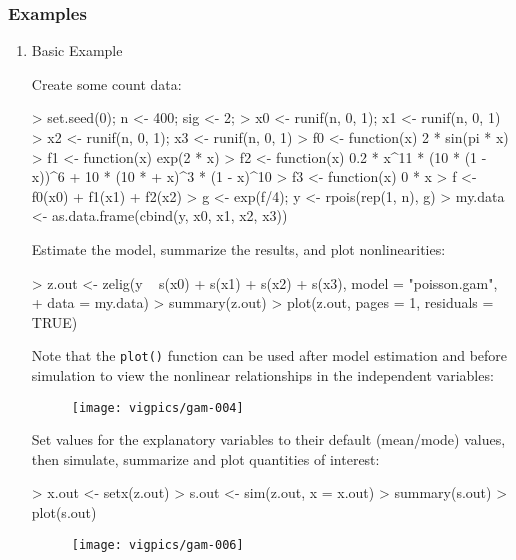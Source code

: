 \subsubsection{Examples}
\begin{enumerate}
\item Basic Example

Create some count data:

\begin{Schunk}
\begin{Sinput}
> set.seed(0);  n <- 400; sig <- 2; 
> x0 <- runif(n, 0, 1);  x1 <- runif(n, 0, 1)
> x2 <- runif(n, 0, 1);  x3 <- runif(n, 0, 1)
> f0 <- function(x) 2 * sin(pi * x)
> f1 <- function(x) exp(2 * x)
> f2 <- function(x) 0.2 * x^11 * (10 * (1 - x))^6 + 10 * (10 * 
+     x)^3 * (1 - x)^10
> f3 <- function(x) 0 * x
> f <- f0(x0) + f1(x1) + f2(x2)
> g <- exp(f/4);  y <- rpois(rep(1, n), g)
> my.data <- as.data.frame(cbind(y, x0, x1, x2, x3))
\end{Sinput}
\end{Schunk}

Estimate the model, summarize the results, and plot nonlinearities:

\begin{Schunk}
\begin{Sinput}
> z.out <- zelig(y ~ s(x0) + s(x1) + s(x2) + s(x3), model = "poisson.gam", 
+     data = my.data)
> summary(z.out)
> plot(z.out, pages = 1, residuals = TRUE)
\end{Sinput}
\end{Schunk}
Note that the {\tt plot()} function can be used after model estimation and before simulation to view the nonlinear relationships in the independent variables: 

\begin{figure}[here]
\centering
\texttt{[image: vigpics/gam-004]}
\label{fig:plotgam}
\end{figure}

Set values for the explanatory variables to their default (mean/mode) values, then simulate, summarize and plot quantities of interest:
\begin{Schunk}
\begin{Sinput}
> x.out <- setx(z.out)
> s.out <- sim(z.out, x = x.out)
> summary(s.out)
> plot(s.out)
\end{Sinput}
\end{Schunk}

\begin{figure}[here]
\centering
\texttt{[image: vigpics/gam-006]}
\label{fig:plotgam}
\end{figure}


\end{enumerate}
